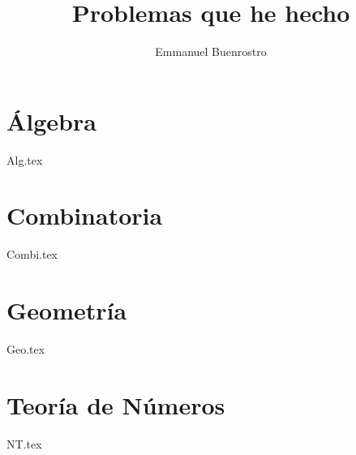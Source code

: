 \documentclass[11pt]{scrbook}
\title {Problemas que he hecho}
\author{Emmanuel Buenrostro}
\begin{document}
\maketitle  
\tableofcontents

\part{\'Algebra}
{Alg.tex}

\part{Combinatoria}
{Combi.tex}

\part{Geometr\'ia}
{Geo.tex}

\part{Teor\'ia de N\'umeros}
{NT.tex}

\nocite{*}

\printbibliography[
heading=bibintoc,
title={Bibliograf\'ia}
]
\end{document}
